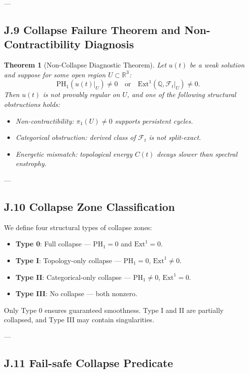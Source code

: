 \documentclass[11pt]{article}
\newtheorem{theorem}{Theorem}[section]
\theoremstyle{definition}
\begin{document}
---

\subsection*{J.9 Collapse Failure Theorem and Non-Contractibility Diagnosis}

\begin{theorem}[Non-Collapse Diagnostic Theorem]
Let \( u(t) \) be a weak solution and suppose for some open region \( U \subset \mathbb{R}^3 \):
\[
\mathrm{PH}_1(u(t)|_U) \neq 0 \quad \text{or} \quad \mathrm{Ext}^1(\mathbb{Q}, \mathcal{F}_t|_U) \neq 0.
\]
Then \( u(t) \) is not provably regular on \( U \), and one of the following structural obstructions holds:
\begin{itemize}
  \item[(a)] Non-contractibility: \( \pi_1(U) \neq 0 \) supports persistent cycles.
  \item[(b)] Categorical obstruction: derived class of \( \mathcal{F}_t \) is not split-exact.
  \item[(c)] Energetic mismatch: topological energy $C(t)$ decays slower than spectral enstrophy.
\end{itemize}
\end{theorem}

---

\subsection*{J.10 Collapse Zone Classification}

We define four structural types of collapse zones:

\begin{itemize}
  \item \textbf{Type 0}: Full collapse — $\mathrm{PH}_1 = 0$ and $\mathrm{Ext}^1 = 0$.
  \item \textbf{Type I}: Topology-only collapse — $\mathrm{PH}_1 = 0$, $\mathrm{Ext}^1 \neq 0$.
  \item \textbf{Type II}: Categorical-only collapse — $\mathrm{PH}_1 \neq 0$, $\mathrm{Ext}^1 = 0$.
  \item \textbf{Type III}: No collapse — both nonzero.
\end{itemize}

Only Type 0 ensures guaranteed smoothness. Type I and II are partially collapsed, and Type III may contain singularities.

---

\subsection*{J.11 Fail-safe Collapse Predicate}
\end{document}
